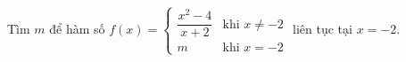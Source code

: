 \begin{ex}
Tìm $m$ để hàm số $f(x)=\begin{cases}\dfrac{x^2-4}{x+2}&\text{khi }x\ne-2\\m&\text{khi }x=-2\end{cases}$ liên tục tại $x=-2$.
\end{ex}
